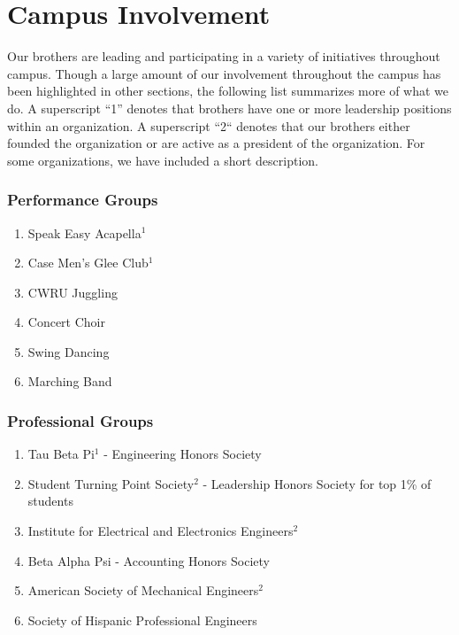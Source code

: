 \chapter{Campus Involvement}

  Our brothers are leading and participating in a variety of initiatives throughout campus. Though a large amount of our involvement throughout the campus has been highlighted in other sections, the following list summarizes more of what we do. A superscript ``1'' denotes that brothers have one or more leadership positions within an organization. A superscript ``2`` denotes that our brothers either founded the organization or are active as a president of the organization. For some organizations, we have included a short description.
    
    \subsection*{Performance Groups}
      \begin{enumerate}
      	\item Speak Easy Acapella$^1$
      	
      	\item Case Men's Glee Club$^1$
      	
      	\item CWRU Juggling
      	
      	\item Concert Choir
      	
      	\item Swing Dancing
      	
      	\item Marching Band
      	
      \end{enumerate}
      
    \subsection*{Professional Groups}
      \begin{enumerate}
      	\item Tau Beta Pi$^1$ - Engineering Honors Society
      	
      	\item Student Turning Point Society$^2$ - Leadership Honors Society for top 1\% of students
      	
      	\item Institute for Electrical and Electronics Engineers$^2$
      	
      	\item Beta Alpha Psi - Accounting Honors Society
      	
      	\item American Society of Mechanical Engineers$^2$
      	
      	\item Society of Hispanic Professional Engineers
      \end{enumerate}
      
